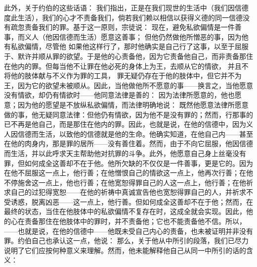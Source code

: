 此外，关于约伯的这些话语： 我们指出，正是在我们现世的生活中（我们因信德度此生活），我们的心才不责备我们，倘若我们赖以相信以获得义德的同一信德没有疏忽责备我们的罪。基于这一原则，宗徒说： 现在，避免私欲偏情是一件善事，而义人（他因信德而生活）愿意这善事； 但他仍然做他所憎恶的事，因为他有私欲偏情，尽管他 如果他这样行了，那时他确实是自己行了这事，以至于屈服于、默许并顺从罪的欲望。于是他的心责备他，因为它责备他自己，而非责备那住在他内的罪。但每当他不让罪在他必死的身体上为王，去顺从它的情欲， 并且不将他的肢体献与不义作为罪的工具， 罪无疑仍存在于他的肢体中，但它并不为王，因为它的欲望未被顺从。因此，当他做他所不愿意的事——换言之，当他愿意没有情欲，却仍有情欲时——他同意法律是善的： 因为法律所愿意的，他也愿意；因为他的愿望是不放纵私欲偏情，而法律明确地说： 既然他愿意法律所愿意做的事，他无疑同意法律：但他仍有情欲，因为他不是没有罪的；然而，行那事的已不再是他自己，而是那住在他内的罪。因此，也就是说，在他的信德中，因为义人因信德而生活，以致他的信德就是他的生命。他确实知道，在他自己内——甚至在他的肉身内，那是罪的居所——没有善住着。然而，由于不向它屈服，他因信德而生活，并以此呼求天主帮助他对抗罪的斗争。此外，他愿意自己身上丝毫没有罪，但如何成全这善却不在于他。他所欠缺的不仅仅是一件善事，更是它的。因为在他不屈服这一点上，他行善；在他憎恨自己的情欲这一点上，他再次行善；在他不停施舍这一点上，他也行善；在他宽恕得罪自己的人这一点上，他行善；在他祈求自己的过犯得宽恕——在他的祈祷中真诚宣告他也宽恕得罪自己的人，并祈求不受诱惑，脱离凶恶——这一点上，他行善。但如何成全这善却不在于他；然而，在最终的状态，当住在他肢体中的私欲偏情不复存在时，这成全就会实现。因此，他的心在责备那住在他肢体中的罪时，并不责备他；它也不能责备他不信。所以，——也就是说，在他的信德中——他既未受自己内心的责备，也未被证明并非没有罪。约伯自己也承认这一点，他说： 那么，关于他从中所引的段落，我们已尽力说明了它们应按何种意义来理解。然而，他未能解释他自己从同一中所引的话的含义：\par


